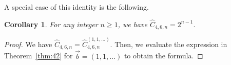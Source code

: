 \documentclass[11pt]{article}
\newtheorem{theorem}{Theorem}[section]
\newtheorem{corollary}[theorem]{Corollary}
\theoremstyle{remark}
\theoremstyle{definition}
\begin{document}
A special case of this identity is the following.
\begin{corollary}
\label{cor:2^n}
    For any integer $n\geq 1$, we have
    $\widehat{C}_{4, 6,n}= 2^{n-1}.$
\end{corollary}
\begin{proof}
  We have $\widehat{C}_{4, 6, n}= \widehat{C}_{4, 6, n}^{(1, 1, \dots)}$. Then, we evaluate the expression in Theorem~\ref{thm:42} for $\vec{b} =(1, 1, \dots)$ to obtain the formula.
\end{proof}

\end{document}

